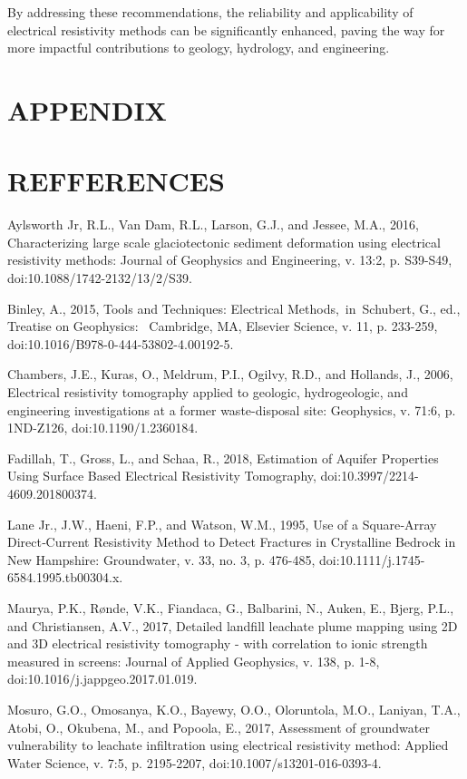 \documentclass[12pt,a4paper]{report}
\begin{document}
By addressing these recommendations, the reliability and applicability of electrical resistivity methods can be significantly enhanced, paving the way for more impactful contributions to geology, hydrology, and engineering.

\chapter*{APPENDIX}

\chapter*{REFFERENCES}
Aylsworth Jr, R.L., Van Dam, R.L., Larson, G.J., and Jessee, M.A., 2016, Characterizing large scale glaciotectonic sediment deformation using electrical resistivity methods: Journal of Geophysics and Engineering, v. 13:2, p. S39-S49, doi:10.1088/1742-2132/13/2/S39.

Binley, A., 2015, Tools and Techniques: Electrical Methods, in Schubert, G., ed., Treatise on Geophysics:  Cambridge, MA, Elsevier Science, v. 11, p. 233-259, doi:10.1016/B978-0-444-53802-4.00192-5.

Chambers, J.E., Kuras, O., Meldrum, P.I., Ogilvy, R.D., and Hollands, J., 2006, Electrical resistivity tomography applied to geologic, hydrogeologic, and engineering investigations at a former waste-disposal site: Geophysics, v. 71:6, p. 1ND-Z126, doi:10.1190/1.2360184.

Fadillah, T., Gross, L., and Schaa, R., 2018, Estimation of Aquifer Properties Using Surface Based Electrical Resistivity Tomography, doi:10.3997/2214-4609.201800374.

Lane Jr., J.W., Haeni, F.P., and Watson, W.M., 1995, Use of a Square‐Array Direct‐Current Resistivity Method to Detect Fractures in Crystalline Bedrock in New Hampshire: Groundwater, v. 33, no. 3, p. 476-485, doi:10.1111/j.1745-6584.1995.tb00304.x.

Maurya, P.K., Rønde, V.K., Fiandaca, G., Balbarini, N., Auken, E., Bjerg, P.L., and Christiansen, A.V., 2017, Detailed landfill leachate plume mapping using 2D and 3D electrical resistivity tomography - with correlation to ionic strength measured in screens: Journal of Applied Geophysics, v. 138, p. 1-8, doi:10.1016/j.jappgeo.2017.01.019.

Mosuro, G.O., Omosanya, K.O., Bayewy, O.O., Oloruntola, M.O., Laniyan, T.A., Atobi, O., Okubena, M., and Popoola, E., 2017, Assessment of groundwater vulnerability to leachate infiltration using electrical resistivity method: Applied Water Science, v. 7:5, p. 2195-2207, doi:10.1007/s13201-016-0393-4.
\end{document}
